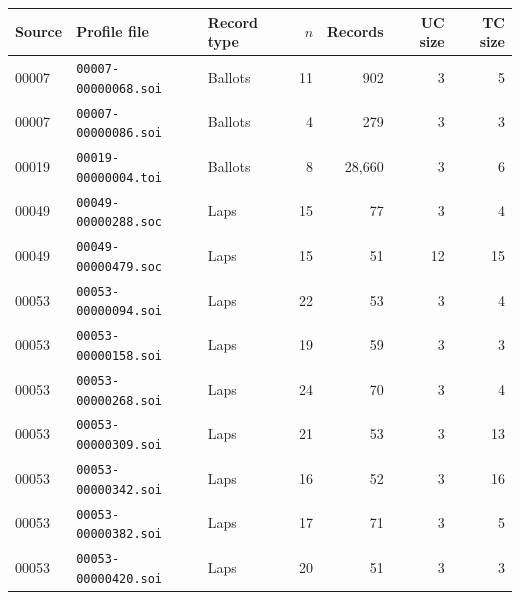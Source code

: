 \begin{tabular}{@{}lllrrrr@{}}
\toprule
Source & Profile file & Record type & $n$ & Records & UC size & TC size\\
\midrule
00007 & \texttt{00007-00000068.soi} & Ballots & 11 & 902 & 3 & 5\\
00007 & \texttt{00007-00000086.soi} & Ballots & 4 & 279 & 3 & 3\\
00019 & \texttt{00019-00000004.toi} & Ballots & 8 & 28,660 & 3 & 6\\
00049 & \texttt{00049-00000288.soc} & Laps & 15 & 77 & 3 & 4\\
00049 & \texttt{00049-00000479.soc} & Laps & 15 & 51 & 12 & 15\\
00053 & \texttt{00053-00000094.soi} & Laps & 22 & 53 & 3 & 4\\
00053 & \texttt{00053-00000158.soi} & Laps & 19 & 59 & 3 & 3\\
00053 & \texttt{00053-00000268.soi} & Laps & 24 & 70 & 3 & 4\\
00053 & \texttt{00053-00000309.soi} & Laps & 21 & 53 & 3 & 13\\
00053 & \texttt{00053-00000342.soi} & Laps & 16 & 52 & 3 & 16\\
00053 & \texttt{00053-00000382.soi} & Laps & 17 & 71 & 3 & 5\\
00053 & \texttt{00053-00000420.soi} & Laps & 20 & 51 & 3 & 3\\
\bottomrule
\end{tabular}
